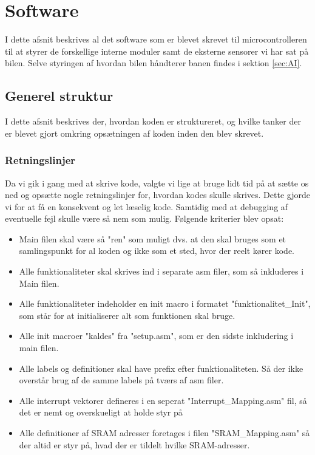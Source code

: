 \section{Software}
I dette afsnit beskrives al det software som er blevet skrevet til microcontrolleren til at styrer de forskellige interne moduler samt de eksterne sensorer vi har sat på bilen. Selve styringen af hvordan bilen håndterer banen findes i sektion \ref{sec:AI}.

\subsection{Generel struktur}
I dette afsnit beskrives der, hvordan koden er struktureret, og hvilke tanker der er blevet gjort omkring opsætningen af koden inden den blev skrevet.

\subsubsection{Retningslinjer}
Da vi gik i gang med at skrive kode, valgte vi lige at bruge lidt tid på at sætte os ned og opsætte nogle retningslinjer for, hvordan kodes skulle skrives. Dette gjorde vi for at få en konsekvent og let læselig kode. Samtidig med at debugging af eventuelle fejl skulle være så nem som mulig. Følgende kriterier blev opsat:

\begin{itemize}[noitemsep,nolistsep,topsep=0ex]
	\item Main filen skal være så "ren" som muligt dvs. at den skal bruges som et samlingspunkt for al koden og ikke som et 		sted, hvor der reelt kører kode.
	\item Alle funktionaliteter skal skrives ind i separate asm filer, som så inkluderes i Main filen.
	\item Alle funktionaliteter indeholder en init macro i formatet "funktionalitet\_Init", som står for at initialiserer 			alt som funktionen skal bruge. 
	\item Alle init macroer "kaldes" fra "setup.asm", som er den sidste inkludering i main filen.
	\item Alle labels og definitioner skal have prefix efter funktionaliteten. Så der ikke overstår brug af de samme labels 		på tværs af asm filer.
	\item Alle interrupt vektorer defineres i en seperat "Interrupt\_Mapping.asm" fil, så det er nemt og overskueligt at 			holde styr på
	\item Alle definitioner af SRAM adresser foretages i filen "SRAM\_Mapping.asm" så der altid er styr på, hvad der er 				tildelt hvilke SRAM-adresser.
\end{itemize}

